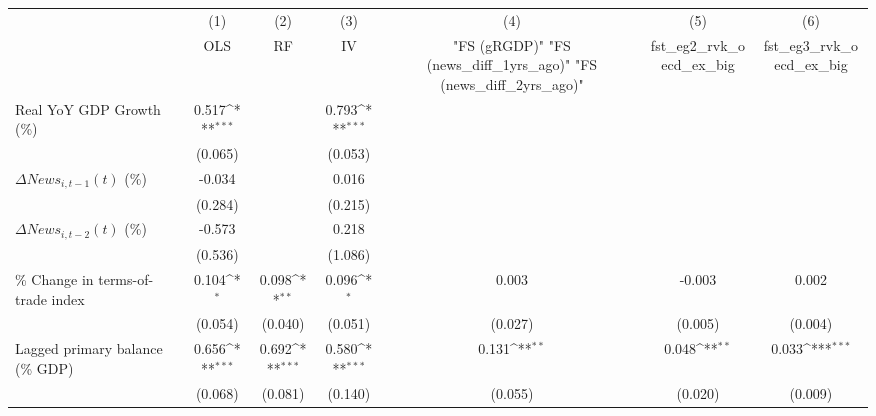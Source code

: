 {
\def\sym#1{\ifmmode^{#1}\else\(^{#1}\)\fi}
\begin{tabular}{l*{6}{c}}
\toprule
                    &\multicolumn{1}{c}{(1)}&\multicolumn{1}{c}{(2)}&\multicolumn{1}{c}{(3)}&\multicolumn{1}{c}{(4)}&\multicolumn{1}{c}{(5)}&\multicolumn{1}{c}{(6)}\\
                    &\multicolumn{1}{c}{OLS}&\multicolumn{1}{c}{RF}&\multicolumn{1}{c}{IV}&\multicolumn{1}{c}{ "FS (gRGDP)"  "FS (news_diff_1yrs_ago)"  "FS (news_diff_2yrs_ago)" }&\multicolumn{1}{c}{fst_eg2_rvk_oecd_ex_big}&\multicolumn{1}{c}{fst_eg3_rvk_oecd_ex_big}\\
\midrule
Real YoY GDP Growth (\%)&       0.517\sym{***}&                     &       0.793\sym{***}&                     &                     &                     \\
                    &     (0.065)         &                     &     (0.053)         &                     &                     &                     \\
\addlinespace
$ \Delta News_{i,t-1}(t)$ (\%)&      -0.034         &                     &       0.016         &                     &                     &                     \\
                    &     (0.284)         &                     &     (0.215)         &                     &                     &                     \\
\addlinespace
$ \Delta News_{i,t-2}(t)$ (\%)&      -0.573         &                     &       0.218         &                     &                     &                     \\
                    &     (0.536)         &                     &     (1.086)         &                     &                     &                     \\
\addlinespace
\% Change in terms-of-trade index&       0.104\sym{*}  &       0.098\sym{**} &       0.096\sym{*}  &       0.003         &      -0.003         &       0.002         \\
                    &     (0.054)         &     (0.040)         &     (0.051)         &     (0.027)         &     (0.005)         &     (0.004)         \\
\addlinespace
Lagged primary balance (\% GDP)&       0.656\sym{***}&       0.692\sym{***}&       0.580\sym{***}&       0.131\sym{**} &       0.048\sym{**} &       0.033\sym{***}\\
                    &     (0.068)         &     (0.081)         &     (0.140)         &     (0.055)         &     (0.020)         &     (0.009)         \\

\end{tabular}}
